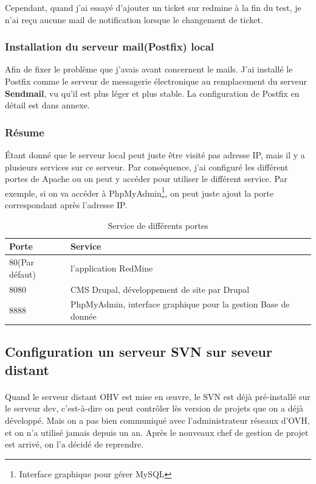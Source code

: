 Cependant, quand j'ai essayé d'ajouter un ticket sur redmine à la fin du test, je n'ai reçu aucune  mail de notification lorsque le changement de ticket.

\subsubsection{Installation du serveur mail(Postfix) local}
Afin de fixer le problème que j'avais avant concernent le mails. J'ai installé le Postfix comme le serveur de messagerie électronique au remplacement du serveur \textbf{Sendmail}, vu qu'il est plus léger et plus stable. La configuration de Postfix en détail est dans annexe.

\subsubsection{Résume}
Étant donné que le serveur local peut juste être visité pas adresse IP, mais il y a plusieurs services sur ce serveur. Par conséquence, j'ai configuré les différent portes de Apache ou on peut y accéder pour utiliser le différent service. Par exemple, si on va accéder à PhpMyAdmin\footnote{Interface graphique pour gérer MySQL}, on peut juste ajout la porte correspondant après l'adresse IP.

\begin{table}[htbp]
\centering
\begin{tabular}{ll}
  \toprule
  Porte & Service\\
  \midrule
	80(Par défaut) & l'application RedMine \\ 	 
	8080 & CMS Drupal, développement de site par Drupal \\ 	 
	8888 & PhpMyAdmin, interface graphique pour la gestion Base de donnée \\ 	 
  \bottomrule
\end{tabular}
 \caption{\label{tab:Service de différents portes}Service de différents portes}
\end{table}

\subsection{Configuration un serveur SVN sur seveur distant}
\paragraph{}
Quand le serveur distant OHV est mise en œuvre, le SVN est déjà pré-installé sur le serveur dev, c'est-à-dire on peut contrôler lès version de projets que on a déjà développé. Mais on a pas bien communiqué avec l'administrateur réseaux d'OVH, et on n'a utilisé jamais depuis un an. Après le nouveaux chef de gestion de projet est arrivé, on l'a décidé de reprendre. 

